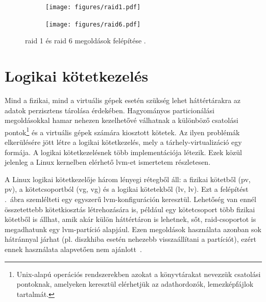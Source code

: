 \begin{figure}[!ht]
	\centering
	\begin{subfigure}{0.3\textwidth}
		\centering
		\texttt{[image: figures/raid1.pdf]}
	\end{subfigure}
	\hspace{0.05\textwidth}
	\begin{subfigure}{0.6\textwidth}
		\centering
		\texttt{[image: figures/raid6.pdf]}
	\end{subfigure}
	\caption{\acrshort{raid} 1 és \acrshort{raid} 6 megoldások felépítése \cite{WikiRaidLevels}.}
	\label{fig:raid}
\end{figure}


\section{Logikai kötetkezelés}
\label{sect:lvm}
Mind a fizikai, mind a virtuális gépek esetén szükség lehet háttértárakra az adatok perzisztens tárolása érdekében. Hagyományos particionálási megoldásokkal hamar nehezen kezelhetővé válhatnak a különböző csatolási pontok\footnote{Unix-alapú operációs rendszerekben azokat a könyvtárakat nevezzük csatolási pontoknak, amelyeken keresztül elérhetjük az adathordozók, lemezképfájlok tartalmát.} és a virtuális gépek számára kiosztott kötetek. Az ilyen problémák elkerülésére jött létre a logikai kötetkezelés, mely a tárhely-virtualizáció egy formája. A logikai kötetkezelésnek több implementációja létezik. %
Ezek közül jelenleg a Linux kernelben elérhető \gls{lvm}-et ismertetem részletesen.

A Linux logikai kötetkezelője három lényegi rétegből áll: a fizikai kötetből (\acrlong{pv}, \acrshort{pv}), a kötetcsoportból (\acrlong{vg}, \acrshort{vg}) és a logikai kötetekből (\acrlong{lv}, \acrshort{lv}). Ezt a felépítést .~ábra szemlélteti egy egyszerű \gls{lvm}-konfiguráción keresztül.
Lehetőség van ennél összetettebb kötetkiosztás létrehozására is, például egy kötetcsoport több fizikai kötetből is állhat, amik akár külön háttértáron is lehetnek, sőt, \acrshort{raid}-csoportot is megadhatunk egy \gls{lvm}-partíció alapjául. Ezen megoldások használata azonban sok hátránnyal járhat (pl. diszkhiba esetén nehezebb visszaállítani a partíciót), ezért ennek használata alapvetően nem ajánlott~\cite{RHLVM}.


